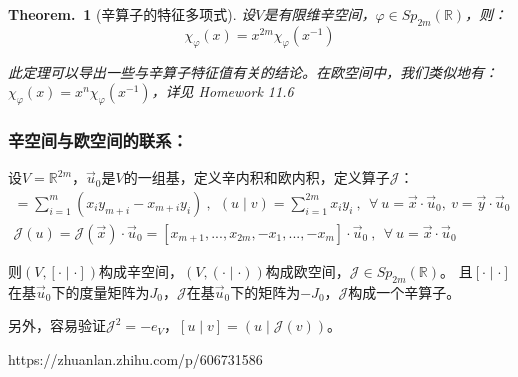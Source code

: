\documentclass[zihao=5,UTF8]{report}
\theoremstyle{mystyle} %
\newtheorem{theorem}{Theorem.\,}
\begin{document}
\begin{theorem}[辛算子的特征多项式]\label{辛算子的特征多项式}
    设$V$是有限维辛空间，$\varphi \in Sp_{2m}(\mathbb{R})$，则：
    \begin{equation*}
        \chi_{\varphi}(x) = x^{2m}\chi_{\varphi}(x^{-1})
    \end{equation*}
    {\par\color{gray}\small
    此定理可以导出一些与辛算子特征值有关的结论。在欧空间中，我们类似地有：
    $\chi_{\varphi}(x) = x^n\chi_{\varphi}(x^{-1})$，详见 Homework 11.6
    \par}
\end{theorem}

\subsubsection{辛空间与欧空间的联系：}
设$V = \mathbb{R}^{2m}$，$\vec{u}_0$是$V$的一组基，定义辛内积和欧内积，定义算子$\mathcal{J}$：
\begin{gather*}
    [u\mid v] = \sum_{i=1}^{m}(x_iy_{m+i} - x_{m+i}y_{i})\ ,\ \ (u\mid v) = \sum_{i=1}^{2m}x_iy_i\ ,\ \ \forall\ u = \vec{x}\cdot\vec{u}_0,\ v = \vec{y}\cdot\vec{u}_0\\
    \mathcal{J}(u) = \mathcal{J}(\vec{x})\cdot\vec{u}_0 = [x_{m+1},...,x_{2m},-x_1,...,-x_m]\cdot \vec{u}_0\ ,\ \ \forall\ u = \vec{x}\cdot\vec{u}_0
\end{gather*}\par
则$(V,[\cdot\mid \cdot])$构成辛空间，$(V,(\cdot\mid \cdot))$构成欧空间，$\mathcal{J} \in Sp_{2m}(\mathbb{R})$。
且$[\cdot\mid \cdot]$在基$\vec{u}_0$下的度量矩阵为$J_0$，$\mathcal{J} $在基$\vec{u}_0$下的矩阵为$-J_0$，$\mathcal{J}$构成一个辛算子。
\par
另外，容易验证$\mathcal{J}^2 = -e_V$，$[u\mid v] = (u\mid \mathcal{J}(v))$。\par
https://zhuanlan.zhihu.com/p/606731586
\end{document}
